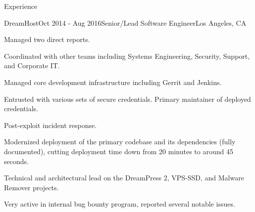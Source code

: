 \documentclass{resume} %
\begin{document}
\begin{rSection}{Experience}
\begin{rSubsection}{DreamHost}{Oct 2014 - Aug 2016}{Senior/Lead Software Engineer}{Los Angeles, CA}
\item Managed two direct reports.
\item Coordinated with other teams including Systems Engineering, Security, Support, and Corporate IT.
\item Managed core development infrastructure including Gerrit and Jenkins.
\item Entrusted with various sets of secure credentials. Primary maintainer of deployed credentials.
\item Post-exploit incident response.
\item Modernized deployment of the primary codebase and its dependencies (fully documented), cutting deployment time down from 20 minutes to around 45 seconds.
\item Technical and architectural lead on the DreamPress 2, VPS-SSD, and Malware Remover projects.
\item Very active in internal bug bounty program, reported several notable issues.
\end{rSubsection}



\end{rSection}
\end{document}
